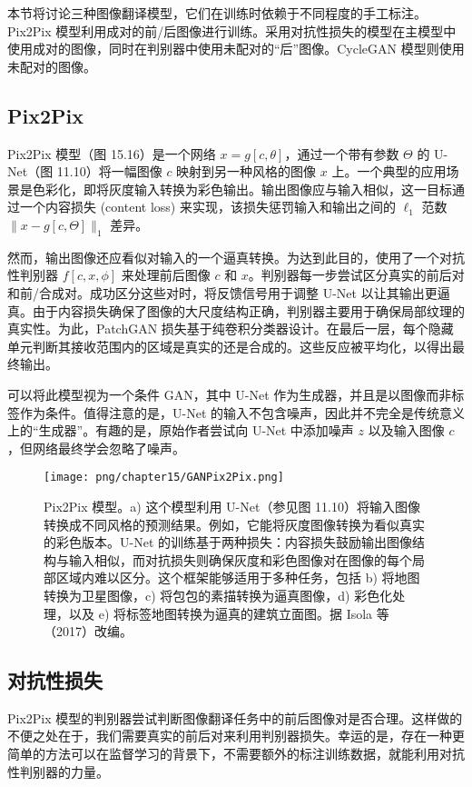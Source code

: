 本节将讨论三种图像翻译模型，它们在训练时依赖于不同程度的手工标注。Pix2Pix 模型利用成对的前/后图像进行训练。采用对抗性损失的模型在主模型中使用成对的图像，同时在判别器中使用未配对的“后”图像。CycleGAN 模型则使用未配对的图像。

\subsection{Pix2Pix}
Pix2Pix 模型（图 15.16）是一个网络 \(x = g[c, \theta]\)，通过一个带有参数 \(\Theta\) 的 U-Net（图 11.10）将一幅图像 \(c\) 映射到另一种风格的图像 \(x\) 上。一个典型的应用场景是色彩化，即将灰度输入转换为彩色输出。输出图像应与输入相似，这一目标通过一个内容损失 (content loss) 来实现，该损失惩罚输入和输出之间的 \(\ell_1\) 范数 \(\|x - g[c, \Theta]\|_1\) 差异。

然而，输出图像还应看似对输入的一个逼真转换。为达到此目的，使用了一个对抗性判别器 \(f[c, x, \phi]\) 来处理前后图像 \(c\) 和 \(x\)。判别器每一步尝试区分真实的前后对和前/合成对。成功区分这些对时，将反馈信号用于调整 U-Net 以让其输出更逼真。由于内容损失确保了图像的大尺度结构正确，判别器主要用于确保局部纹理的真实性。为此，PatchGAN 损失基于纯卷积分类器设计。在最后一层，每个隐藏单元判断其接收范围内的区域是真实的还是合成的。这些反应被平均化，以得出最终输出。

可以将此模型视为一个条件 GAN，其中 U-Net 作为生成器，并且是以图像而非标签作为条件。值得注意的是，U-Net 的输入不包含噪声，因此并不完全是传统意义上的“生成器”。有趣的是，原始作者尝试向 U-Net 中添加噪声 \(z\) 以及输入图像 \(c\)，但网络最终学会忽略了噪声。

\begin{figure}[ht!]
\centering
\texttt{[image: png/chapter15/GANPix2Pix.png]}
\caption{Pix2Pix 模型。a) 这个模型利用 U-Net（参见图 11.10）将输入图像转换成不同风格的预测结果。例如，它能将灰度图像转换为看似真实的彩色版本。U-Net 的训练基于两种损失：内容损失鼓励输出图像结构与输入相似，而对抗损失则确保灰度和彩色图像对在图像的每个局部区域内难以区分。这个框架能够适用于多种任务，包括 b) 将地图转换为卫星图像，c) 将包包的素描转换为逼真图像，d) 彩色化处理，以及 e) 将标签地图转换为逼真的建筑立面图。据 Isola 等（2017）改编。}
\end{figure}


\subsection{对抗性损失}
Pix2Pix 模型的判别器尝试判断图像翻译任务中的前后图像对是否合理。这样做的不便之处在于，我们需要真实的前后对来利用判别器损失。幸运的是，存在一种更简单的方法可以在监督学习的背景下，不需要额外的标注训练数据，就能利用对抗性判别器的力量。

